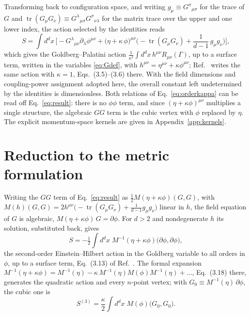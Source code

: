 \documentclass[prd,aps,preprint,nofootinbib,amsmath,amssymb,eqsecnum]{revtex4-2}
\begin{document}
Transforming back to configuration space, and writing $g_\mu\equiv G^{\sigma}{}_{\mu\sigma}$ for
the trace of $G$ and $\operatorname{tr}(G_\mu G_\nu)\equiv G^{\lambda}{}_{\mu\sigma}G^{\sigma}{}_{\nu\lambda}$
for the matrix trace over the upper and one lower index, the action selected by the identities reads
\begin{equation}
S=\int d^dx\,\Big[-G^{\lambda}{}_{\mu\nu}\partial_\lambda\phi^{\mu\nu}
+\big(\eta+\kappa\,\phi\big)^{\mu\nu}
\Big(-\operatorname{tr}(G_\mu G_\nu)+\frac{1}{d-1}\,g_\mu g_\nu\Big)\Big],
\label{eq:result}
\end{equation}
which gives the Goldberg--Palatini action
$\frac{1}{\kappa^2}\int d^dx\,h^{\mu\nu}R_{\mu\nu}(\Gamma)$, up to a surface term, written in the variables
\eqref{eq:Gdef}, with $h^{\mu\nu}=\eta^{\mu\nu}+\kappa\phi^{\mu\nu}$; Ref.~\cite{BrandtMcKeon2016}
writes the same action with $\kappa=1$, Eqs.~(3.5)--(3.6) there. With the field dimensions
and coupling-power assignment adopted here, the overall constant left undetermined by the
identities is dimensionless. Both relations of Eq.~\eqref{eq:orderkappa} can be read off
Eq.~\eqref{eq:result}: there is no $\phi\phi$ term, and since $(\eta+\kappa\phi)^{\mu\nu}$
multiplies a single structure, the algebraic $GG$ term is the cubic vertex with $\phi$
replaced by $\eta$.
The explicit momentum-space kernels are given in Appendix~\ref{app:kernels}.

\section{Reduction to the metric formulation}
\label{sec:checks}

Writing the $GG$ term of Eq.~\eqref{eq:result}
as $\tfrac12 M(\eta+\kappa\phi)(G,G)$, with
$M(h)(G,G)=2h^{\mu\nu}\big(-\operatorname{tr}(G_\mu G_\nu)+\tfrac{1}{d-1}g_\mu g_\nu\big)$
linear in $h$, the field equation of $G$ is algebraic, $M(\eta+\kappa\phi)\,G=\partial\phi$.
For $d>2$ and nondegenerate $h$ its solution, substituted back, gives
\begin{equation}
S=-\tfrac12\int d^dx\;M^{-1}(\eta+\kappa\phi)\big(\partial\phi,\partial\phi\big),
\label{eq:second}
\end{equation}
the second-order Einstein--Hilbert action in the Goldberg variable to all orders in $\phi$,
up to a surface term, Eq.~(3.13) of Ref.~\cite{BrandtMcKeon2016}. The formal expansion
$M^{-1}(\eta+\kappa\phi)=M^{-1}(\eta)-\kappa\,M^{-1}(\eta)M(\phi)M^{-1}(\eta)+\dots$,
Eq.~(3.18) there, generates the quadratic action and every $n$-point vertex; with
$G_0\equiv M^{-1}(\eta)\,\partial\phi$, the cubic one is
\begin{equation}
S^{(3)}=\frac{\kappa}{2}\int d^dx\;M(\phi)\big(G_0,G_0\big).
\label{eq:cubicvertex}
\end{equation}
\end{document}
